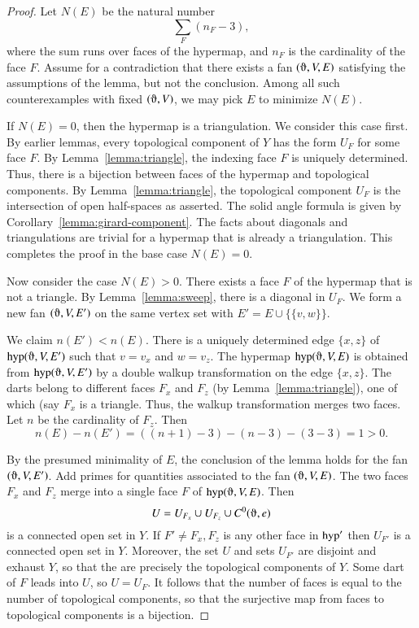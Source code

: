 \begin{proof}
Let $N(E)$ be the natural number
$$
\sum_F (n_F - 3),
$$
where the sum runs over faces of the hypermap, and $n_F$ is the
cardinality of the face $F$.
Assume for a contradiction that there exists a fan $(\orgn,V,E)$ 
satisfying the assumptions of the lemma, but not the conclusion.
Among all such counterexamples with fixed $(\orgn,V)$, we may pick
$E$ to minimize  $N(E)$.

If $N(E)=0$, then the hypermap is a triangulation.  We consider this
case first.  By earlier lemmas, every topological component of $Y$ has
the form $U_F$ for some face $F$.  By Lemma~\ref{lemma:triangle}, the indexing
face $F$ is uniquely determined.  Thus, there is a bijection between
faces of the hypermap and topological components.  By Lemma~\ref{lemma:triangle}, the topological component $U_F$ is the intersection of open half-spaces as asserted.  The solid angle formula is given by Corollary~\ref{lemma:girard-component}.  The facts about diagonals and triangulations are trivial for a hypermap
that is already a triangulation. This completes the proof in the base
case $N(E)=0$.


Now consider the case $N(E)>0$.  There exists a face $F$ of the hypermap
that is not a triangle.  By Lemma~\ref{lemma:sweep}, there is a diagonal in $U_F$.
We form a new fan $(\orgn,V,E')$ on the same vertex set with
$E' = E\cup \{\{v,w\}\}$.   

We claim $n(E')<n(E)$.
There is a uniquely determined edge $\{x,z\}$ of
$\op{hyp}(\orgn,V,E')$ such that $v=v_x$ and $w=v_z$. The hypermap $\op{hyp}(\orgn,V,E)$ is obtained
from $\op{hyp}(\orgn,V,E')$ by a double walkup transformation on the
edge $\{x,z\}$.  The darts belong to different faces $F_x$ and $F_z$
(by Lemma~\ref{lemma:triangle}), one of which (say $F_x$ is a triangle.  Thus, the
walkup transformation merges two faces.  Let $n$ be the cardinality of $F_z$.
Then 
$$n(E) - n(E') = ((n+1)-3) - (n-3) - (3-3) = 1 >0.$$

By the presumed minimality of $E$, the conclusion of the lemma holds for the
fan $(\orgn,V,E')$.  Add primes
for quantities associated to the fan $(\orgn,V,E)$.  The two faces
$F_x$ and $F_z$ merge into a single face $F$ of $\op{hyp}(\orgn,V,E)$.
Then 
\begin{equation}\label{eqn:U}
U= U_{F_x}\cup U_{F_z}\cup C^0(\orgn,e)
\end{equation} 
is a connected open set in $Y$.
If $F'\ne F_x,F_z$ is any other face in ${\operatorname{hyp}}'$ then $U_{F'}$ is
a connected open set in $Y$.  Moreover, the set $U$ and sets $U_{F'}$
are disjoint and exhaust $Y$, so that the are precisely the topological
components of $Y$.  Some dart of $F$ leads into $U$, so $U=U_F$.  It follows
that the number of faces is equal to the number of topological components, so that the surjective map from faces to topological components is a bijection.


\end{proof}
